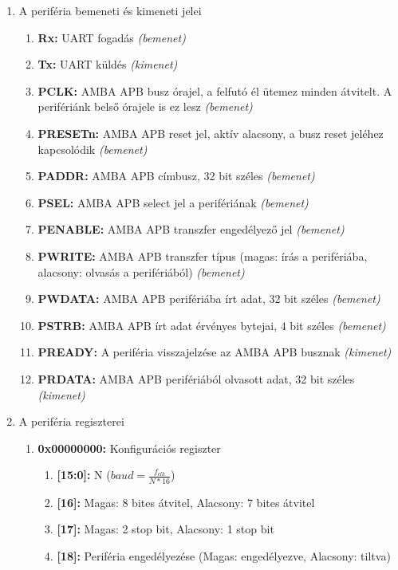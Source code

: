 \begin{enumerate}
\item A periféria bemeneti és kimeneti jelei
\begin{enumerate}
\item \textbf{Rx:} UART fogadás \textit{(bemenet)}
\item \textbf{Tx:} UART küldés \textit{(kimenet)}
\item \textbf{PCLK:} AMBA APB busz órajel, a felfutó él ütemez minden átvitelt. A perifériánk belső órajele is ez lesz \textit{(bemenet)}
\item \textbf{PRESETn:} AMBA APB reset jel, aktív alacsony, a busz reset jeléhez kapcsolódik \textit{(bemenet)}
 \item \textbf{PADDR:} AMBA APB címbusz, 32 bit széles \textit{(bemenet)}
\item \textbf{PSEL:} AMBA APB select jel a perifériának \textit{(bemenet)}
\item \textbf{PENABLE:} AMBA APB transzfer engedélyező jel \textit{(bemenet)}
\item \textbf{PWRITE:} AMBA APB transzfer típus (magas: írás a perifériába, alacsony: olvasás a perifériából) \textit{(bemenet)}
\item \textbf{PWDATA:} AMBA APB perifériába írt adat, 32 bit széles \textit{(bemenet)}
\item \textbf{PSTRB:} AMBA APB írt adat érvényes bytejai, 4 bit széles \textit{(bemenet)}

\item \textbf{PREADY:} A periféria visszajelzése az AMBA APB busznak \textit{(kimenet)}
\item \textbf{PRDATA:} AMBA APB perifériából olvasott adat, 32 bit széles \textit{(kimenet)}

\end{enumerate}

\item A periféria regiszterei
\begin{enumerate}
\item \textbf{0x00000000:} Konfigurációs regiszter
\begin{enumerate}
\item \textbf{[15:0]:} N ($baud = \frac{f_{clk}}{N*16}$)
\item \textbf{[16]:} Magas: 8 bites átvitel, Alacsony: 7 bites átvitel
\item \textbf{[17]:} Magas: 2 stop bit, Alacsony: 1 stop bit
\item \textbf{[18]:} Periféria engedélyezése (Magas: engedélyezve, Alacsony: tiltva)


\end{enumerate}
\end{enumerate}
\end{enumerate}
